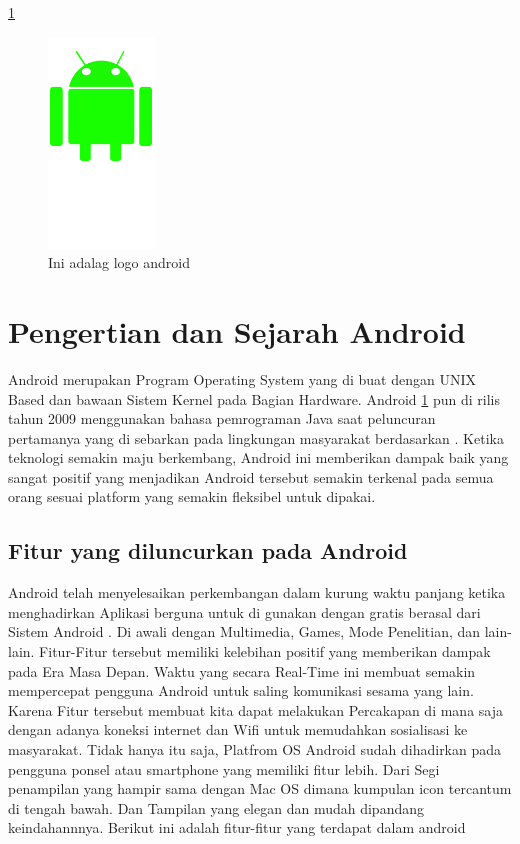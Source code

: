 
\ref{androidfigures}
\begin{figure}[ht]
\centerline{\includegraphics[width=0.25\textwidth]{figures/androidfigures.jpg}}
\caption{Ini adalag logo android}
\label{androidfigures}
\end{figure}
\section{Pengertian dan Sejarah Android}
	Android merupakan Program Operating System yang di buat dengan UNIX Based dan bawaan Sistem Kernel
	pada Bagian Hardware. Android \ref{androidfigures} pun di rilis tahun 2009 menggunakan bahasa pemrograman Java saat peluncuran pertamanya yang
	di sebarkan pada lingkungan masyarakat berdasarkan \cite{rasjid2015android}. Ketika teknologi semakin maju berkembang, Android ini memberikan dampak baik yang sangat positif
	yang menjadikan Android tersebut semakin terkenal pada semua orang sesuai platform yang semakin fleksibel untuk dipakai.
	
	\subsection{Fitur yang diluncurkan pada Android}
	Android telah menyelesaikan perkembangan dalam kurung waktu panjang ketika menghadirkan Aplikasi berguna untuk di gunakan dengan gratis berasal dari Sistem Android . Di awali
	dengan Multimedia, Games, Mode Penelitian, dan lain-lain. Fitur-Fitur tersebut memiliki kelebihan positif yang memberikan dampak pada Era Masa Depan.
	Waktu yang secara Real-Time ini membuat semakin mempercepat pengguna Android untuk saling komunikasi sesama yang lain. Karena Fitur tersebut
	membuat kita dapat melakukan Percakapan di mana saja dengan adanya koneksi internet dan Wifi untuk memudahkan sosialisasi ke masyarakat.
	Tidak hanya itu saja, Platfrom OS Android sudah dihadirkan pada pengguna ponsel atau smartphone yang memiliki fitur lebih.
	Dari Segi penampilan yang hampir sama dengan Mac OS dimana kumpulan icon tercantum di tengah bawah. Dan Tampilan yang elegan dan mudah
	dipandang keindahannnya. Berikut ini adalah fitur-fitur yang terdapat dalam android \cite{triadi2013bedah}


